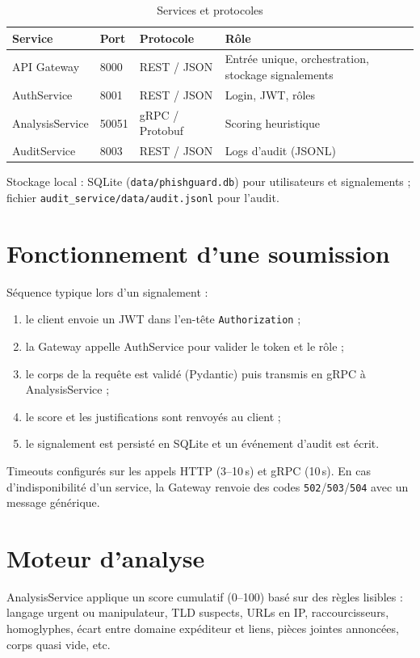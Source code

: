\documentclass[11pt,a4paper]{article}
\begin{document}
\begin{table}[htbp]
  \centering
  \caption{Services et protocoles}
  \begin{tabular}{@{}llll@{}}
    \toprule
    Service & Port & Protocole & Rôle \\
    \midrule
    API Gateway & 8000 & REST / JSON & Entrée unique, orchestration, stockage signalements \\
    AuthService & 8001 & REST / JSON & Login, JWT, rôles \\
    AnalysisService & 50051 & gRPC / Protobuf & Scoring heuristique \\
    AuditService & 8003 & REST / JSON & Logs d'audit (JSONL) \\
    \bottomrule
  \end{tabular}
\end{table}

Stockage local : SQLite (\texttt{data/phishguard.db}) pour utilisateurs et signalements ;
fichier \texttt{audit\_service/data/audit.jsonl} pour l'audit.

\section{Fonctionnement d'une soumission}

Séquence typique lors d'un signalement :
\begin{enumerate}
  \item le client envoie un JWT dans l'en-tête \texttt{Authorization} ;
  \item la Gateway appelle AuthService pour valider le token et le rôle ;
  \item le corps de la requête est validé (Pydantic) puis transmis en gRPC à AnalysisService ;
  \item le score et les justifications sont renvoyés au client ;
  \item le signalement est persisté en SQLite et un événement d'audit est écrit.
\end{enumerate}

Timeouts configurés sur les appels HTTP (3--10\,s) et gRPC (10\,s). En cas d'indisponibilité
d'un service, la Gateway renvoie des codes \texttt{502}/\texttt{503}/\texttt{504} avec un
message générique.

\section{Moteur d'analyse}

AnalysisService applique un score cumulatif (0--100) basé sur des règles lisibles :
langage urgent ou manipulateur, TLD suspects, URLs en IP, raccourcisseurs, homoglyphes,
écart entre domaine expéditeur et liens, pièces jointes annoncées, corps quasi vide, etc.
\end{document}
